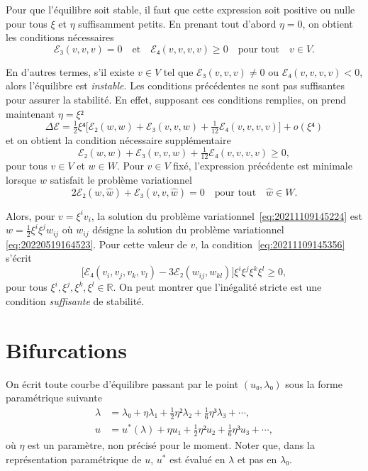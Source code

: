 \documentclass[12pt, final]{scrartcl}
\theoremstyle{definition}
\newcommand{\reals}{\mathbb{R}}
\begin{document}
Pour que l'équilibre soit stable, il faut que cette expression soit positive ou
nulle pour tous \(ξ\) et \(η\) suffisamment petits. En prenant tout d'abord
\(η = 0\), on obtient les conditions nécessaires
\begin{equation}
  \label{eq:20211108164416}
  ℰ₃(v, v, v) = 0 \quad \text{et} \quad ℰ₄(v, v, v, v) \geq 0 \quad \text{pour tout} \quad v∈V.
\end{equation}

En d'autres termes, s'il existe \(v∈V\) tel que \(ℰ₃(v, v, v) \neq 0\) ou
\(ℰ₄(v, v, v, v) < 0\), alors l'équilibre est \emph{instable}. Les conditions
précédentes ne sont pas suffisantes pour assurer la stabilité. En effet,
supposant ces conditions remplies, on prend maintenant \(η = ξ²\)
\begin{equation}
  Δℰ = \tfrac{1}{2} ξ⁴ \bigl[ ℰ₂(w, w) + ℰ₃(v, v, w) + \tfrac{1}{12} ℰ₄(v, v, v, v) \bigr] + o(ξ⁴)
\end{equation}
et on obtient la condition nécessaire supplémentaire
\begin{equation}
  \label{eq:20211109145356}
  ℰ₂(w, w) + ℰ₃(v, v, w) + \tfrac{1}{12} ℰ₄(v, v, v, v) \geq 0,
\end{equation}
pour tous \(v∈V\) et \(w∈W\). Pour \(v∈V\) fixé, l'expression précédente est
minimale lorsque \(w\) satisfait le problème variationnel
\begin{equation}
  \label{eq:20211109145224}
  2ℰ₂(w, \hat{w}) +ℰ₃(v, v, \hat{w}) = 0 \quad \text{pour tout} \quad \hat{w}∈W.
\end{equation}

Alors, pour \(v = ξ^i v_i\), la solution du problème
variationnel~\eqref{eq:20211109145224} est \(w = \tfrac{1}{2} ξ^i ξ^j w_{ij}\)
où \(w_{ij}\) désigne la solution du problème variationnel
\eqref{eq:20220519164523}. Pour cette valeur de \(v\), la
condition~\eqref{eq:20211109145356} s'écrit
\begin{equation}
  \bigl[ℰ₄(v_i, v_j, v_k, v_l) - 3ℰ₂(w_{ij}, w_{kl})\bigr] ξ^i ξ^j ξ^k ξ^l \geq 0,
\end{equation}
pour tous \(ξ^i, ξ^j, ξ^k, ξ^l∈\reals\). On peut montrer que l'inégalité stricte
est une condition \emph{suffisante} de
stabilité. 

\section{Bifurcations}

On écrit toute courbe d'équilibre passant par le point \((u₀, λ₀)\) sous la
forme paramétrique suivante
\begin{align}
  \label{eq:20211115075817}
  λ &=  λ₀ + η λ₁ + \tfrac{1}{2} η² λ₂ + \tfrac{1}{6} η³ λ₃ + \cdots,\\
  \label{eq:20211115075835}
  u &= u^{\ast}(λ) + η u₁ + \tfrac{1}{2} η² u₂ + \tfrac{1}{6} η³ u₃ + \cdots,
\end{align}
où \(η\) est un paramètre, non précisé pour le moment. Noter que, dans la
représentation paramétrique de \(u\), \(u^{\ast}\) est évalué en \(λ\) et pas en
\(λ₀\).
\end{document}
